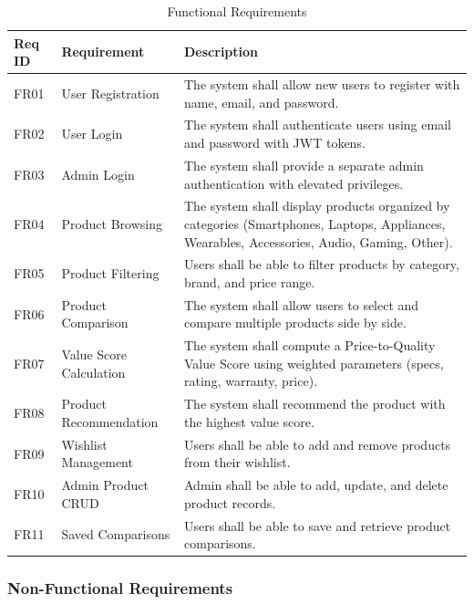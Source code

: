 \begin{table}[H]
\centering
\small
\renewcommand{\arraystretch}{1.3}
\begin{tabular}{|p{1.5cm}|p{3.5cm}|p{7.5cm}|}
    \hline
    \textbf{Req ID} & \textbf{Requirement} & \textbf{Description} \\
    \hline
    FR01 & User Registration & The system shall allow new users to register with name, email, and password. \\
    \hline
    FR02 & User Login & The system shall authenticate users using email and password with JWT tokens. \\
    \hline
    FR03 & Admin Login & The system shall provide a separate admin authentication with elevated privileges. \\
    \hline
    FR04 & Product Browsing & The system shall display products organized by categories (Smartphones, Laptops, Appliances, Wearables, Accessories, Audio, Gaming, Other). \\
    \hline
    FR05 & Product Filtering & Users shall be able to filter products by category, brand, and price range. \\
    \hline
    FR06 & Product Comparison & The system shall allow users to select and compare multiple products side by side. \\
    \hline
    FR07 & Value Score Calculation & The system shall compute a Price-to-Quality Value Score using weighted parameters (specs, rating, warranty, price). \\
    \hline
    FR08 & Product Recommendation & The system shall recommend the product with the highest value score. \\
    \hline
    FR09 & Wishlist Management & Users shall be able to add and remove products from their wishlist. \\
    \hline
    FR10 & Admin Product CRUD & Admin shall be able to add, update, and delete product records. \\
    \hline
    FR11 & Saved Comparisons & Users shall be able to save and retrieve product comparisons. \\
    \hline
\end{tabular}
\caption{Functional Requirements}
\label{tab:functional_req}
\end{table}

\subsubsection{Non-Functional Requirements}

